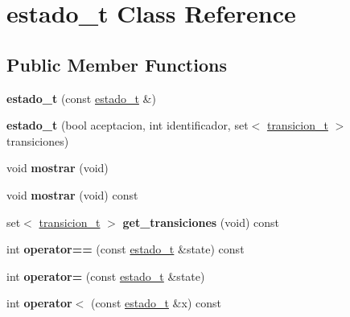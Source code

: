 \hypertarget{classestado__t}{}\section{estado\+\_\+t Class Reference}
\label{classestado__t}
\subsection*{Public Member Functions}
\begin{DoxyCompactItemize}
\item 
\hypertarget{classestado__t_ac3dd69d9374264ee0a54868e60773473}{}\label{classestado__t_ac3dd69d9374264ee0a54868e60773473} 
{\bfseries estado\+\_\+t} (const \hyperlink{classestado__t}{estado\+\_\+t} \&)
\item 
\hypertarget{classestado__t_a6449b0df4424701fe557bb076eb9f686}{}\label{classestado__t_a6449b0df4424701fe557bb076eb9f686} 
{\bfseries estado\+\_\+t} (bool aceptacion, int identificador, set$<$ \hyperlink{classtransicion__t}{transicion\+\_\+t} $>$ transiciones)
\item 
\hypertarget{classestado__t_ae1a568503925422d4be8c8325e38f71f}{}\label{classestado__t_ae1a568503925422d4be8c8325e38f71f} 
void {\bfseries mostrar} (void)
\item 
\hypertarget{classestado__t_a3b370085ea3a175eef9637b5f74d674e}{}\label{classestado__t_a3b370085ea3a175eef9637b5f74d674e} 
void {\bfseries mostrar} (void) const
\item 
\hypertarget{classestado__t_a70f4365b605b5ae15f8a7d33b6f06749}{}\label{classestado__t_a70f4365b605b5ae15f8a7d33b6f06749} 
set$<$ \hyperlink{classtransicion__t}{transicion\+\_\+t} $>$ {\bfseries get\+\_\+transiciones} (void) const
\item 
\hypertarget{classestado__t_a6de44d60b6209194de7d8326f0de257f}{}\label{classestado__t_a6de44d60b6209194de7d8326f0de257f} 
int {\bfseries operator==} (const \hyperlink{classestado__t}{estado\+\_\+t} \&state) const
\item 
\hypertarget{classestado__t_ac4d7ea38c876de0a5a6f202ce76a4087}{}\label{classestado__t_ac4d7ea38c876de0a5a6f202ce76a4087} 
int {\bfseries operator=} (const \hyperlink{classestado__t}{estado\+\_\+t} \&state)
\item 
\hypertarget{classestado__t_a25627118d5e9306e26525c73e6e3a33a}{}\label{classestado__t_a25627118d5e9306e26525c73e6e3a33a} 
int {\bfseries operator$<$} (const \hyperlink{classestado__t}{estado\+\_\+t} \&x) const
\item 

\end{DoxyCompactItemize}
